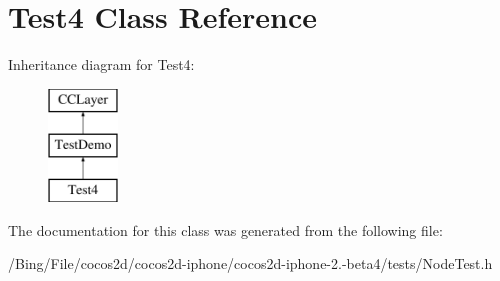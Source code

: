 \hypertarget{interface_test4}{\section{Test4 Class Reference}
\label{interface_test4}
}
Inheritance diagram for Test4\-:\begin{figure}[H]
\begin{center}
\leavevmode
\includegraphics[height=3.000000cm]{interface_test4}
\end{center}
\end{figure}


The documentation for this class was generated from the following file\-:\begin{DoxyCompactItemize}
\item 
/\-Bing/\-File/cocos2d/cocos2d-\/iphone/cocos2d-\/iphone-\/2.-\/beta4/tests/Node\-Test.\-h\end{DoxyCompactItemize}
